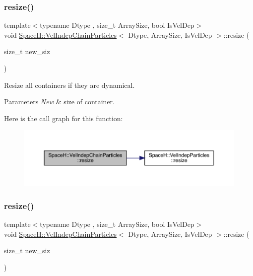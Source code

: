 \subsubsection{\texorpdfstring{resize()}{resize()}\hspace{0.1cm}{\footnotesize\ttfamily [1/2]}}
{\footnotesize\ttfamily template$<$typename Dtype , size\+\_\+t Array\+Size, bool Is\+Vel\+Dep$>$ \\
void \mbox{\hyperlink{class_space_h_1_1_vel_indep_chain_particles}{Space\+H\+::\+Vel\+Indep\+Chain\+Particles}}$<$ Dtype, Array\+Size, Is\+Vel\+Dep $>$\+::resize (\begin{DoxyParamCaption}\item[{size\+\_\+t}]{new\+\_\+siz }\end{DoxyParamCaption})\hspace{0.3cm}{\ttfamily [inline]}}



Resize all containers if they are dynamical. 


\begin{DoxyParams}{Parameters}
{\em New} & size of container. \\
\hline
\end{DoxyParams}
Here is the call graph for this function\+:
\nopagebreak
\begin{figure}[H]
\begin{center}
\leavevmode
\includegraphics[width=350pt]{class_space_h_1_1_vel_indep_chain_particles_afdf6136619e4be707bed1e9859bc7171_cgraph}
\end{center}
\end{figure}
\mbox{\label{class_space_h_1_1_vel_indep_chain_particles_afdf6136619e4be707bed1e9859bc7171}} 
\subsubsection{\texorpdfstring{resize()}{resize()}\hspace{0.1cm}{\footnotesize\ttfamily [2/2]}}
{\footnotesize\ttfamily template$<$typename Dtype , size\+\_\+t Array\+Size, bool Is\+Vel\+Dep$>$ \\
void \mbox{\hyperlink{class_space_h_1_1_vel_indep_chain_particles}{Space\+H\+::\+Vel\+Indep\+Chain\+Particles}}$<$ Dtype, Array\+Size, Is\+Vel\+Dep $>$\+::resize (\begin{DoxyParamCaption}\item[{size\+\_\+t}]{new\+\_\+siz }\end{DoxyParamCaption})\hspace{0.3cm}{\ttfamily [inline]}}



